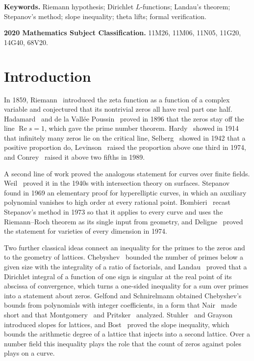 \documentclass[11pt,letterpaper]{article}
\numberwithin{equation}{section}
\begin{document}
\noindent\textbf{Keywords.} Riemann hypothesis; Dirichlet $L$-functions; Landau's theorem; Stepanov's method; slope inequality; theta lifts; formal verification.

\medskip
\noindent\textbf{2020 Mathematics Subject Classification.} 11M26, 11M06, 11N05, 11G20, 14G40, 68V20.

\section{Introduction}\label{sec:intro}

In 1859, Riemann~\cite{riemann} introduced the zeta function as a function of a complex variable and conjectured that its nontrivial zeros all have real part one half. Hadamard~\cite{hadamard} and de la Vall\'ee Poussin~\cite{dlvp} proved in 1896 that the zeros stay off the line $\operatorname{Re}s=1$, which gave the prime number theorem. Hardy~\cite{hardy} showed in 1914 that infinitely many zeros lie on the critical line, Selberg~\cite{selberg42} showed in 1942 that a positive proportion do, Levinson~\cite{levinson} raised the proportion above one third in 1974, and Conrey~\cite{conrey} raised it above two fifths in 1989.

A second line of work proved the analogous statement for curves over finite fields. Weil~\cite{weil48} proved it in the 1940s with intersection theory on surfaces. Stepanov~\cite{stepanov} found in 1969 an elementary proof for hyperelliptic curves, in which an auxiliary polynomial vanishes to high order at every rational point. Bombieri~\cite{bombieri} recast Stepanov's method in 1973 so that it applies to every curve and uses the Riemann--Roch theorem as its single input from geometry, and Deligne~\cite{deligne} proved the statement for varieties of every dimension in 1974.

Two further classical ideas connect an inequality for the primes to the zeros and to the geometry of lattices. Chebyshev~\cite{chebyshev} bounded the number of primes below a given size with the integrality of a ratio of factorials, and Landau~\cite{landau} proved that a Dirichlet integral of a function of one sign is singular at the real point of its abscissa of convergence, which turns a one-sided inequality for a sum over primes into a statement about zeros. Gelfond and Schnirelmann obtained Chebyshev's bounds from polynomials with integer coefficients, in a form that Nair~\cite{nair} made short and that Montgomery~\cite{montgomery} and Pritsker~\cite{pritsker} analyzed. Stuhler~\cite{stuhler} and Grayson~\cite{grayson} introduced slopes for lattices, and Bost~\cite{bost} proved the slope inequality, which bounds the arithmetic degree of a lattice that injects into a second lattice. Over a number field this inequality plays the role that the count of zeros against poles plays on a curve.
\end{document}

